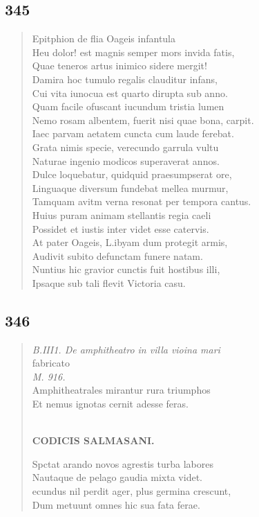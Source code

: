 \documentclass[11pt, a4paper]{report}
\begin{document}
            \subsection*{345}
      \begin{verse}
      Epitphion de flia Oageis infantula \\ Heu dolor! est magnis semper mors invida fatis, \\ Quae teneros artus inimico sidere mergit! \\ Damira hoc tumulo regalis clauditur infans, \\ Cui vita iunocua est quarto dirupta sub anno. \\ Quam facile ofuscant iucundum tristia lumen \\ Nemo rosam albentem, fuerit nisi quae bona, carpit. \\ Iaec parvam aetatem cuncta cum laude ferebat. \\ Grata nimis specie, verecundo garrula vultu \\ Naturae ingenio modicos superaverat annos. \\ Dulce loquebatur, quidquid praesumpserat ore, \\ Linguaque diversum fundebat mellea murmur, \\ Tamquam avitm verna resonat per tempora cantus. \\ Huius puram animam stellantis regia caeli \\ Possidet et iustis inter videt esse catervis. \\ At pater Oageis, L.ibyam dum protegit armis, \\ Audivit subito defunctam funere natam. \\ Nuntius hic gravior cunctis fuit hostibus illi, \\ Ipsaque sub tali flevit Victoria casu. \\ 
      \end{verse}
  
            \subsection*{346}
      \begin{verse}
      \textit{B.III1. De amphitheatro in villa vioina mari} \\ fabricato \\ \textit{M. 916.} \\ Amphitheatrales mirantur rura triumphos \\ Et nemus ignotas cernit adesse feras. \\ 
        ﻿\pagebreak 
    \begin{center} \textbf{CODICIS SALMASANI.} \end{center} \marginpar{[275]} Spctat arando novos agrestis turba labores \\ Nautaque de pelago gaudia mixta videt. \\ ecundus nil perdit ager, plus germina crescunt, \\ Dum metuunt omnes hic sua fata ferae. \\ 
      \end{verse}
  
\end{document}
